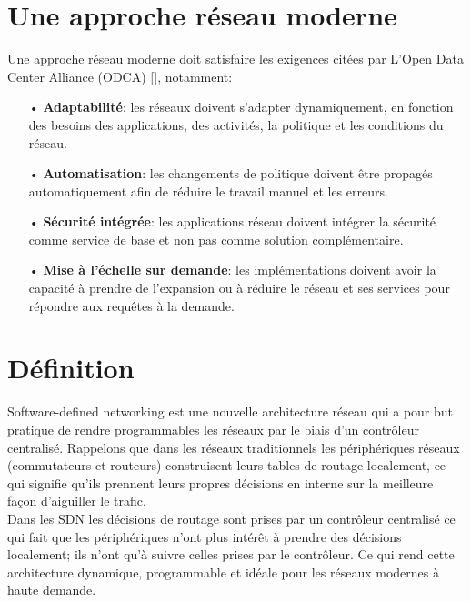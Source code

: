 \newpage
\section{Une approche réseau moderne}
Une approche réseau moderne doit satisfaire les exigences citées par L’Open Data Center Alliance (ODCA)  [\cite{2}], notamment:\\
\begin{itemize}
\item[•] \textbf{Adaptabilité}: les réseaux doivent s’adapter dynamiquement, en fonction des besoins des applications, des activités, la politique et les conditions du réseau.\\
\item[•] \textbf{Automatisation}: les changements de politique doivent être propagés automatiquement afin de réduire le travail manuel et les erreurs.\\
\item[•] \textbf{Sécurité intégrée}: les applications réseau doivent intégrer la sécurité comme service de base et non pas comme solution complémentaire.\\
\item[•] \textbf{Mise à l’échelle sur demande}: les implémentations doivent avoir la capacité à prendre de l’expansion ou à réduire le réseau et ses services pour répondre aux requêtes à la demande.
\end{itemize}


\section{Définition}

Software-defined networking est une nouvelle architecture réseau qui a pour but pratique de rendre programmables les réseaux par le biais d’un contrôleur centralisé. Rappelons que dans les réseaux traditionnels les périphériques réseaux (commutateurs et routeurs) construisent leurs tables de routage localement, ce qui signifie qu’ils prennent leurs propres décisions en interne sur la meilleure façon d’aiguiller le trafic. \\

Dans les SDN les décisions de routage sont prises par un contrôleur centralisé ce qui fait que les périphériques n’ont plus intérêt à prendre des décisions localement; ils n’ont qu’à suivre celles prises par le contrôleur. Ce qui rend cette architecture dynamique, programmable et idéale pour les réseaux modernes à haute demande.

